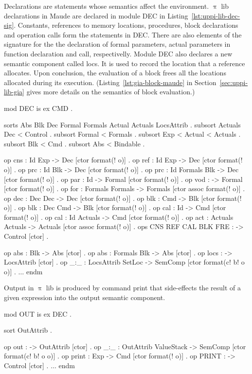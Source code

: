 \documentclass[a4paper,openany]{book}
\begin{document}
Declarations are statements whose semantics affect the environment. $\uppi$ lib declarations in Maude are declared in module DEC in Listing~\ref{lst:uppi-lib-dec-sig}. Constants, references to memory locations, procedures, block declarations and operation calls form the statements in DEC. There are also elements of the signature for the the declaration of formal parameters, actual parameters in function declaration and call, respectivelly. Module DEC also declares a new semantic component called locs. It is used to record the location that a reference allocates. Upon conclusion, the evaluation of a block frees all the locations allocated during its execution.  (Listing~\ref{lst:gia-block-maude} in Section~\ref{sec:uppi-lib-gia} gives more details on the semantics of block evaluation.)
\begin{maude}[caption=Signature for $\uppi$ lib declarations in Maude, label=lst:uppi-lib-dec-sig]
mod DEC is
    ex CMD .

    sorts Abs Blk Dec Formal Formals Actual Actuals LocsAttrib .
    subsort Actuals Dec < Control .
    subsort Formal < Formals .
    subsort Exp < Actual < Actuals .
    subsort Blk < Cmd .
    subsort Abs < Bindable .

    op cns : Id Exp -> Dec [ctor format(! o)] .
    op ref : Id Exp -> Dec [ctor format(! o)] .
    op prc : Id Blk -> Dec [ctor format(! o)] .
    op prc : Id Formals Blk -> Dec [ctor format(! o)] .
    op par : Id -> Formal [ctor format(! o)] .
    op vod : -> Formal [ctor format(! o)] .
    op for : Formals Formals -> Formals [ctor assoc format(! o)] .
    op dec : Dec Dec -> Dec [ctor format(! o)] .
    op blk : Cmd -> Blk [ctor format(! o)] .
    op blk : Dec Cmd -> Blk [ctor format(! o)] .
    op cal : Id -> Cmd [ctor format(! o)] .
    op cal : Id Actuals -> Cmd [ctor format(! o)] .
    op act : Actuals Actuals -> Actuals [ctor assoc format(! o)] .
    ops CNS REF CAL BLK FRE : -> Control [ctor] .
    
    op abs : Blk -> Abs [ctor] .
    op abs : Formals Blk -> Abs [ctor] .
    op locs : -> LocsAttrib [ctor] .
    op _:_ : LocsAttrib Set{Loc} -> SemComp [ctor format(c! b! o o)] .
    $\ldots$
endm
\end{maude}

Output in $\uppi$ lib is produced by command print that side-effects the result of a given expression into the output semantic component.
\begin{maude}[caption={Signature for $\uppi$ lib output in Maude}, label=lst:uppi-lib-output-sig]
mod OUT is
    ex DEC .

    sort OutAttrib .

    op out : -> OutAttrib [ctor] .
    op _:_ : OutAttrib ValueStack -> SemComp [ctor format(c! b! o o)] .
    op print : Exp -> Cmd [ctor format(! o)] .
    op PRINT : -> Control [ctor] .
    $\ldots$
endm
\end{maude}
\end{document}
